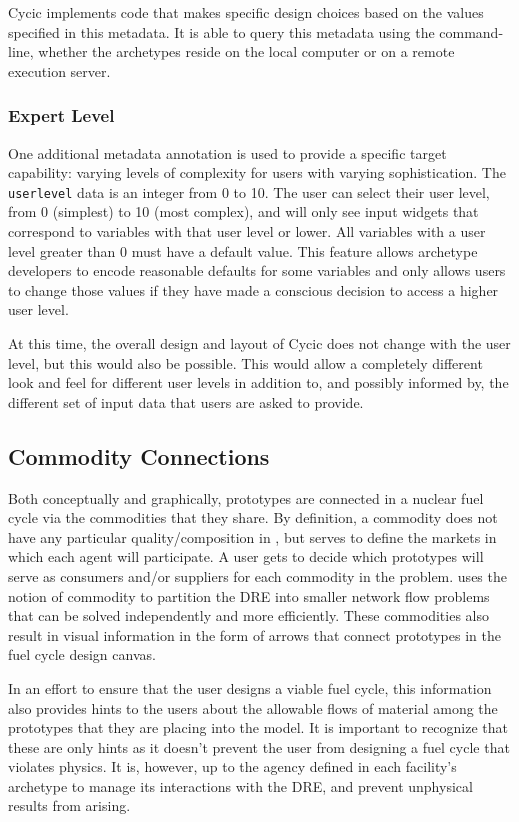 Cycic implements code that makes specific design choices based on the values
specified in this metadata.  It is able to query this metadata using the
\Cyclus command-line, whether the archetypes reside on the local computer or
on a remote execution server.

\subsubsection{Expert Level}

One additional metadata annotation is used to provide a specific target
capability: varying levels of complexity for users with varying
sophistication.  The \texttt{userlevel} data is an integer from 0 to 10.  The
user can select their user level, from 0 (simplest) to 10 (most complex), and
will only see input widgets that correspond to variables with that user level
or lower.  All variables with a user level greater than 0 must have a default
value.  This feature allows archetype developers to encode reasonable defaults
for some variables and only allows users to change those values if they have
made a conscious decision to access a higher user level.

At this time, the overall design and layout of Cycic does not change with the
user level, but this would also be possible.  This would allow a completely
different look and feel for different user levels in addition to, and possibly
informed by, the different set of input data that users are asked to provide.

\subsection{Commodity Connections}

Both conceptually and graphically, prototypes are connected in a nuclear fuel
cycle via the commodities that they share.  By definition, a commodity does
not have any particular quality/composition in \Cyclus, but serves to define
the markets in which each agent will participate.  A user gets to decide which
prototypes will serve as consumers and/or suppliers for each commodity in the
problem.  \Cyclus uses the notion of commodity to partition the \gls{DRE} into
smaller network flow problems that can be solved independently and more
efficiently.  These commodities also result in visual information in the form
of arrows that connect prototypes in the fuel cycle design canvas.

In an effort to ensure that the user designs a viable fuel cycle, this
information also provides hints to the users about the allowable flows of
material among the prototypes that they are placing into the model.  It is
important to recognize that these are only hints as it doesn't prevent the
user from designing a fuel cycle that violates physics.  It is, however, up to
the agency defined in each facility's archetype to manage its interactions
with the \gls{DRE}, and prevent unphysical results from arising.

